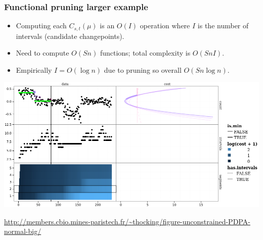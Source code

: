 \documentclass{beamer}
\begin{document}
\begin{frame}
  \frametitle{Functional pruning larger example}

  \begin{itemize}
  \item Computing each $C_{s,t}(\mu)$ is an $O(I)$ operation where $I$
    is the number of intervals (candidate changepoints).
  \item Need to compute $O(Sn)$ functions; total complexity is $O(SnI)$.
  \item Empirically $I=O(\log n)$ due to pruning so overall $O(Sn\log n)$.
  \end{itemize}

\includegraphics[width=\textwidth]{screenshot-PDPA-demo}
%    

\url{http://members.cbio.mines-paristech.fr/~thocking/figure-unconstrained-PDPA-normal-big/}
\end{frame}
\end{document}
